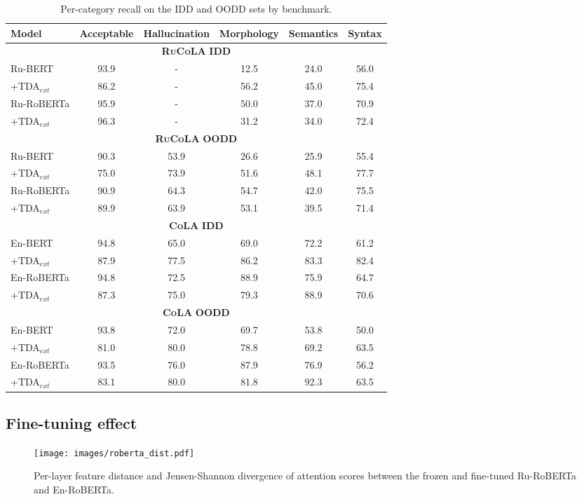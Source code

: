 \documentclass[11pt]{article}
\begin{document}
\begin{table*}[th!]
\centering
\small
\begin{tabular}{lccccc}
\midrule
\textbf{Model} & \textbf{Acceptable} & \textbf{Hallucination} & \textbf{Morphology} & \textbf{Semantics}& \textbf{Syntax}\\
\midrule
\multicolumn{6}{c}{\textbf{\textsc{RuCoLA}} \textbf{IDD}} \\ 
\midrule
Ru-BERT & 93.9 & - & 12.5 & 24.0 & 56.0\\
+TDA$_{ext}$ & 86.2 & - & 56.2 & 45.0 & 75.4 \\
\midrule
Ru-RoBERTa & 95.9 & - & 50.0 & 37.0 & 70.9\\
+TDA$_{ext}$ & 
96.3 & - & 31.2 & 34.0 & 72.4 \\
\midrule
\multicolumn{6}{c}{\textbf{\textsc{RuCoLA}} \textbf{OODD}} \\ 
\midrule
Ru-BERT & 90.3 & 53.9 & 26.6 & 25.9 & 55.4\\
+TDA$_{ext}$ & 
75.0 & 73.9 & 51.6 & 48.1 & 77.7 \\
\midrule
Ru-RoBERTa & 90.9 & 64.3 & 54.7 & 42.0 & 75.5\\
+TDA$_{ext}$ & 89.9 & 63.9 & 53.1 & 39.5 & 71.4 \\
\midrule
\multicolumn{6}{c}{\textbf{\textsc{CoLA}} \textbf{IDD}} \\ 
\midrule
En-BERT & 94.8 & 65.0 & 69.0 & 72.2 & 61.2\\
+TDA$_{ext}$ & 87.9 & 77.5 & 86.2 & 83.3 & 82.4 \\
\midrule
En-RoBERTa & 94.8 & 72.5 & 88.9 & 75.9 & 64.7 \\
+TDA$_{ext}$ & 87.3 & 75.0 & 79.3 & 88.9 & 70.6 \\
\midrule
\multicolumn{6}{c}{\textbf{\textsc{CoLA}} \textbf{OODD}} \\ 
\midrule
En-BERT & 93.8 & 72.0 & 69.7 & 53.8 & 50.0 \\
+TDA$_{ext}$  & 81.0 & 80.0 & 78.8 & 69.2 & 63.5\\
\midrule
En-RoBERTa & 93.5 & 76.0 & 87.9 & 76.9 & 56.2 \\
+TDA$_{ext}$ & 83.1 & 80.0 & 81.8 & 92.3 & 63.5 \\
\bottomrule
\end{tabular}
\caption{\label{tab:scores_cat_dev}
Per-category recall on the IDD and OODD sets by benchmark.
}
\end{table*}


\newpage
\clearpage


\subsection{Fine-tuning effect} \label{subsec:fteff}
\begin{figure*}[th!]
    \centering
    \texttt{[image: images/roberta\_dist.pdf]}
    \caption{Per-layer feature distance and Jensen-Shannon divergence of attention scores between the frozen and fine-tuned
Ru-RoBERTa and En-RoBERTa.}
    \label{fig:roberta_dist}
\end{figure*}
\end{document}
